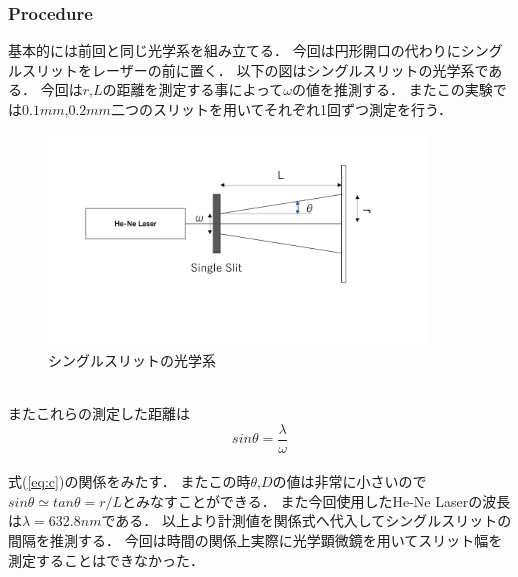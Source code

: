 \documentclass[11pt, a4paper]{jsarticle}
\begin{document}
\subsubsection{Procedure}
基本的には前回と同じ光学系を組み立てる．
今回は円形開口の代わりにシングルスリットをレーザーの前に置く．
以下の図はシングルスリットの光学系である．
今回は$r$,$L$の距離を測定する事によって$\omega$の値を推測する．
またこの実験では$0.1mm$,$0.2mm$二つのスリットを用いてそれぞれ1回ずつ測定を行う．
\begin{figure}[htbp]
 \begin{center}
  \includegraphics[width=100mm]{fig8.png}
 \end{center}
 \caption{シングルスリットの光学系}
 \label{fig:eight}
\end{figure}\\

またこれらの測定した距離は
\begin{equation}
    sin\theta = \frac{\lambda}{\omega} \label{eq:c}
\end{equation}\\
式(\ref{eq:c})の関係をみたす．
またこの時$\theta$,$D$の値は非常に小さいので$sin\theta \simeq tan\theta = r/L$とみなすことができる．
また今回使用したHe-Ne Laserの波長は$\lambda = 632.8nm$である．
以上より計測値を関係式へ代入してシングルスリットの間隔を推測する．
今回は時間の関係上実際に光学顕微鏡を用いてスリット幅を測定することはできなかった．
\end{document}
